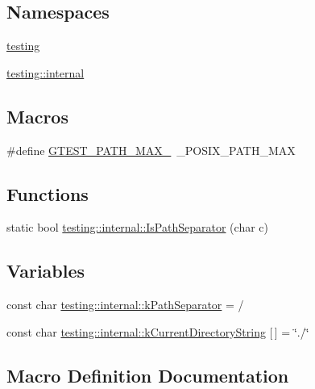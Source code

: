 \subsection*{Namespaces}
\begin{DoxyCompactItemize}
\item 
 \hyperlink{namespacetesting}{testing}
\item 
 \hyperlink{namespacetesting_1_1internal}{testing\+::internal}
\end{DoxyCompactItemize}
\subsection*{Macros}
\begin{DoxyCompactItemize}
\item 
\#define \hyperlink{gtest-filepath_8cc_ad9d445747785a9271a57cf1d392b89ad}{G\+T\+E\+S\+T\+\_\+\+P\+A\+T\+H\+\_\+\+M\+A\+X\+\_\+}~\+\_\+\+P\+O\+S\+I\+X\+\_\+\+P\+A\+T\+H\+\_\+\+M\+AX
\end{DoxyCompactItemize}
\subsection*{Functions}
\begin{DoxyCompactItemize}
\item 
static bool \hyperlink{namespacetesting_1_1internal_a6b8d22cee9edbbfe56077420a6fa1cb1}{testing\+::internal\+::\+Is\+Path\+Separator} (char c)
\end{DoxyCompactItemize}
\subsection*{Variables}
\begin{DoxyCompactItemize}
\item 
const char \hyperlink{namespacetesting_1_1internal_afcd71adaa9d1e6df7b282a17fc48125c}{testing\+::internal\+::k\+Path\+Separator} = \textquotesingle{}/\textquotesingle{}
\item 
const char \hyperlink{namespacetesting_1_1internal_a23a8e9527d0e544e7df2d64ad549ce3e}{testing\+::internal\+::k\+Current\+Directory\+String} \mbox{[}$\,$\mbox{]} = \char`\"{}./\char`\"{}
\end{DoxyCompactItemize}


\subsection{Macro Definition Documentation}
